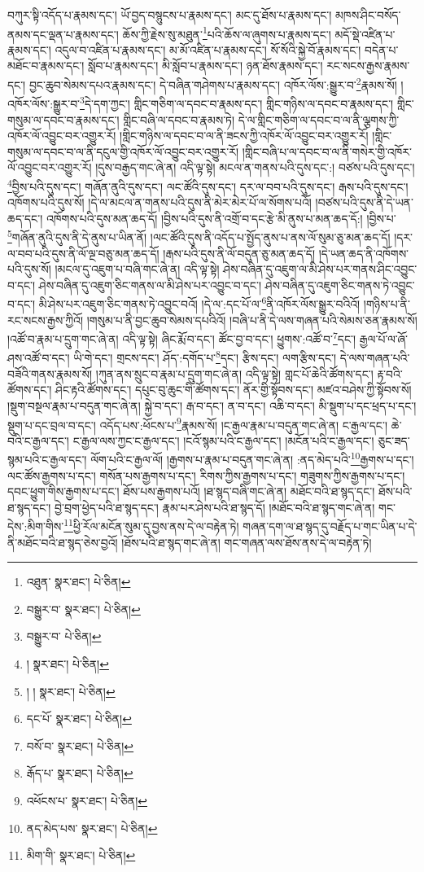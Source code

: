 བཀུར་སྟི་འདོད་པ་རྣམས་དང་། ཡོ་བྱད་བསྙུངས་པ་རྣམས་དང་། མང་དུ་ཐོས་པ་རྣམས་དང་། མཁས་ཤིང་བསོད་ནམས་དང་ལྡན་པ་རྣམས་དང་། ཆོས་ཀྱི་རྗེས་སུ་མཐུན་\footnote{འཐུན་  སྣར་ཐང་།  པེ་ཅིན། }པའི་ཆོས་ལ་ཞུགས་པ་རྣམས་དང་། མདོ་སྡེ་འཛིན་པ་རྣམས་དང་། འདུལ་བ་འཛིན་པ་རྣམས་དང་། མ་མོ་འཛིན་པ་རྣམས་དང་། སོ་སོའི་སྐྱེ་བོ་རྣམས་དང་། བདེན་པ་མཐོང་བ་རྣམས་དང་། སློབ་པ་རྣམས་དང་། མི་སློབ་པ་རྣམས་དང་། ཉན་ཐོས་རྣམས་དང་། རང་སངས་རྒྱས་རྣམས་དང་། བྱང་ཆུབ་སེམས་དཔའ་རྣམས་དང་། དེ་བཞིན་གཤེགས་པ་རྣམས་དང་། འཁོར་ལོས་:སྒྱུར་བ་\footnote{བསྒྱུར་བ་  སྣར་ཐང་།  པེ་ཅིན། }རྣམས་སོ། །
འཁོར་ལོས་:སྒྱུར་བ་\footnote{བསྒྱུར་བ་  པེ་ཅིན། }དེ་དག་ཀྱང་། གླིང་གཅིག་ལ་དབང་བ་རྣམས་དང་། གླིང་གཉིས་ལ་དབང་བ་རྣམས་དང་། གླིང་གསུམ་ལ་དབང་བ་རྣམས་དང་། གླིང་བཞི་ལ་དབང་བ་རྣམས་ཏེ། དེ་ལ་གླིང་གཅིག་ལ་དབང་བ་ལ་ནི་ལྕགས་ཀྱི་འཁོར་ལོ་འབྱུང་བར་འགྱུར་རོ། །གླིང་གཉིས་ལ་དབང་བ་ལ་ནི་ཟངས་ཀྱི་འཁོར་ལོ་འབྱུང་བར་འགྱུར་རོ། །གླིང་གསུམ་ལ་དབང་བ་ལ་ནི་དངུལ་གྱི་འཁོར་ལོ་འབྱུང་བར་འགྱུར་རོ། །གླིང་བཞི་པ་ལ་དབང་བ་ལ་ནི་གསེར་གྱི་འཁོར་ལོ་འབྱུང་བར་འགྱུར་རོ། །དུས་བརྒྱད་གང་ཞེ་ན། འདི་ལྟ་སྟེ། མངལ་ན་གནས་པའི་དུས་དང་:། བཙས་པའི་དུས་དང་། \footnote{།    སྣར་ཐང་།  པེ་ཅིན། }བྱིས་པའི་དུས་དང་། གཞོན་ནུའི་དུས་དང་། ལང་ཚོའི་དུས་དང་། དར་ལ་བབ་པའི་དུས་དང་། རྒས་པའི་དུས་དང་། འཁོགས་པའི་དུས་སོ། །དེ་ལ་མངལ་ན་གནས་པའི་དུས་ནི་མེར་མེར་པོ་ལ་སོགས་པའོ། །བཙས་པའི་དུས་ནི་དེ་ཡན་ཆད་དང་། འཁོགས་པའི་དུས་མན་ཆད་དོ། །བྱིས་པའི་དུས་ནི་འགྲོ་བ་དང་རྩེ་མི་ནུས་པ་མན་ཆད་དོ:། །བྱིས་པ་\footnote{། །  སྣར་ཐང་།  པེ་ཅིན། }གཞོན་ནུའི་དུས་ནི་དེ་ནུས་པ་ཡིན་ནོ། །ལང་ཚོའི་དུས་ནི་འདོད་པ་སྤྱོད་ནུས་པ་ནས་ལོ་སུམ་ཅུ་མན་ཆད་དོ། །དར་ལ་བབ་པའི་དུས་ནི་ལོ་ལྔ་བཅུ་མན་ཆད་དོ། །རྒས་པའི་དུས་ནི་ལོ་བདུན་ཅུ་མན་ཆད་དོ། །དེ་ཡན་ཆད་ནི་འཁོགས་པའི་དུས་སོ། །མངལ་དུ་འཇུག་པ་བཞི་གང་ཞེ་ན། འདི་ལྟ་སྟེ། ཤེས་བཞིན་དུ་འཇུག་ལ་མི་ཤེས་པར་གནས་ཤིང་འབྱུང་བ་དང་། ཤེས་བཞིན་དུ་འཇུག་ཅིང་གནས་ལ་མི་ཤེས་པར་འབྱུང་བ་དང་། ཤེས་བཞིན་དུ་འཇུག་ཅིང་གནས་ཏེ་འབྱུང་བ་དང་། མི་ཤེས་པར་འཇུག་ཅིང་གནས་ཏེ་འབྱུང་བའོ། །དེ་ལ་:དང་པོ་ལ་\footnote{དང་པོ་  སྣར་ཐང་།  པེ་ཅིན། }ནི་འཁོར་ལོས་སྒྱུར་བའིའོ། །གཉིས་པ་ནི་རང་སངས་རྒྱས་ཀྱིའོ། །གསུམ་པ་ནི་བྱང་ཆུབ་སེམས་དཔའིའོ། །བཞི་པ་ནི་དེ་ལས་གཞན་པའི་སེམས་ཅན་རྣམས་སོ། །འཚོ་བ་རྣམ་པ་དྲུག་གང་ཞེ་ན། འདི་ལྟ་སྟེ། ཞིང་རྨོ་བ་དང་། ཚོང་བྱ་བ་དང་། ཕྱུགས་:འཚོ་བ་\footnote{བསོ་བ་  སྣར་ཐང་།  པེ་ཅིན། }དང་། རྒྱལ་པོ་ལ་ཞོ་ཤས་འཚོ་བ་དང་། ཡི་གེ་དང་། གྲངས་དང་། ཤོད་:དགོད་པ་\footnote{རྒོད་པ་  སྣར་ཐང་།  པེ་ཅིན། }དང་། རྩིས་དང་། ལག་རྩིས་དང་། དེ་ལས་གཞན་པའི་བཟོའི་གནས་རྣམས་སོ། །ཀུན་ནས་སྲུང་བ་རྣམ་པ་དྲུག་གང་ཞེ་ན། འདི་ལྟ་སྟེ། གླང་པོ་ཆེའི་ཚོགས་དང་། རྟ་བའི་ཚོགས་དང་། ཤིང་རྟའི་ཚོགས་དང་། དཔུང་བུ་ཆུང་གི་ཚོགས་དང་། ནོར་གྱི་སྟོབས་དང་། མཛའ་བཤེས་ཀྱི་སྟོབས་སོ། །སྡུག་བསྔལ་རྣམ་པ་བདུན་གང་ཞེ་ན། སྐྱེ་བ་དང་། རྒ་བ་དང་། ན་བ་དང་། འཆི་བ་དང་། མི་སྡུག་པ་དང་ཕྲད་པ་དང་། སྡུག་པ་དང་བྲལ་བ་དང་། འདོད་པས་:ཕོངས་པ་\footnote{འཕོངས་པ་  སྣར་ཐང་།  པེ་ཅིན། }རྣམས་སོ། །ང་རྒྱལ་རྣམ་པ་བདུན་གང་ཞེ་ན། ང་རྒྱལ་དང་། ཆེ་བའི་ང་རྒྱལ་དང་། ང་རྒྱལ་ལས་ཀྱང་ང་རྒྱལ་དང་། །ངའོ་སྙམ་པའི་ང་རྒྱལ་དང་། །མངོན་པའི་ང་རྒྱལ་དང་། ཅུང་ཟད་སྙམ་པའི་ང་རྒྱལ་དང་། ལོག་པའི་ང་རྒྱལ་ལོ། །རྒྱགས་པ་རྣམ་པ་བདུན་གང་ཞེ་ན། :ནད་མེད་པའི་\footnote{ནད་མེད་པས་  སྣར་ཐང་།  པེ་ཅིན། }རྒྱགས་པ་དང་། ལང་ཚོས་རྒྱགས་པ་དང་། གསོན་པས་རྒྱགས་པ་དང་། རིགས་ཀྱིས་རྒྱགས་པ་དང་། གཟུགས་ཀྱིས་རྒྱགས་པ་དང་། དབང་ཕྱུག་གིས་རྒྱགས་པ་དང་། ཐོས་པས་རྒྱགས་པའོ། །ཐ་སྙད་བཞི་གང་ཞེ་ན། མཐོང་བའི་ཐ་སྙད་དང་། ཐོས་པའི་ཐ་སྙད་དང་། བྱེ་བྲག་ཕྱེད་པའི་ཐ་སྙད་དང་། རྣམ་པར་ཤེས་པའི་ཐ་སྙད་དོ། །མཐོང་བའི་ཐ་སྙད་གང་ཞེ་ན། གང་དེས་:མིག་གིས་\footnote{མིག་གི་  སྣར་ཐང་།  པེ་ཅིན། }ཕྱི་རོལ་མངོན་སུམ་དུ་བྱས་ནས་དེ་ལ་བརྟེན་ཏེ། གཞན་དག་ལ་ཐ་སྙད་དུ་བརྗོད་པ་གང་ཡིན་པ་དེ་ནི་མཐོང་བའི་ཐ་སྙད་ཅེས་བྱའོ། །ཐོས་པའི་ཐ་སྙད་གང་ཞེ་ན། གང་གཞན་ལས་ཐོས་ནས་དེ་ལ་བརྟེན་ཏེ། 